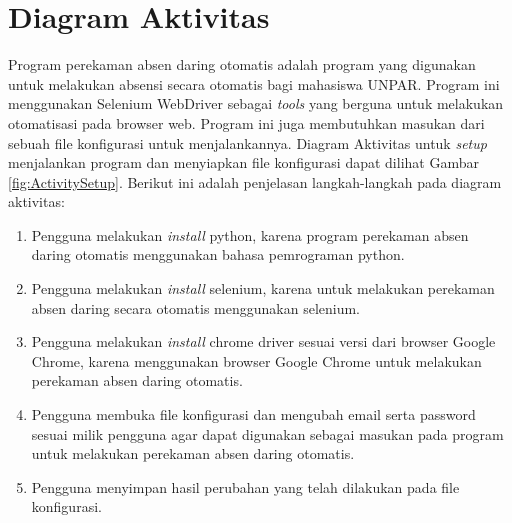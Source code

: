 \section{Diagram Aktivitas}
\label{sec:diagramAktivitas}
Program perekaman absen daring otomatis adalah program yang digunakan untuk melakukan absensi secara otomatis bagi mahasiswa UNPAR. Program ini menggunakan Selenium WebDriver sebagai \textit{tools} yang berguna untuk melakukan otomatisasi pada browser web. Program ini juga membutuhkan masukan dari sebuah file konfigurasi untuk menjalankannya.
Diagram Aktivitas untuk \textit{setup} menjalankan program dan menyiapkan file konfigurasi dapat dilihat Gambar \ref{fig:ActivitySetup}. Berikut ini adalah penjelasan langkah-langkah pada diagram aktivitas:
\begin{enumerate}
	\item Pengguna melakukan \textit{install} python, karena program perekaman absen daring otomatis menggunakan bahasa pemrograman python.
	\item Pengguna melakukan \textit{install} selenium, karena untuk melakukan perekaman absen daring secara otomatis menggunakan selenium.
	\item Pengguna melakukan \textit{install} chrome driver sesuai versi dari browser Google Chrome, karena menggunakan browser Google Chrome untuk melakukan perekaman absen daring otomatis.
	\item Pengguna membuka file konfigurasi dan mengubah email serta password sesuai milik pengguna agar dapat digunakan sebagai masukan pada program untuk melakukan perekaman absen daring otomatis.
	\item Pengguna menyimpan hasil perubahan yang telah dilakukan pada file konfigurasi.
\end{enumerate}
